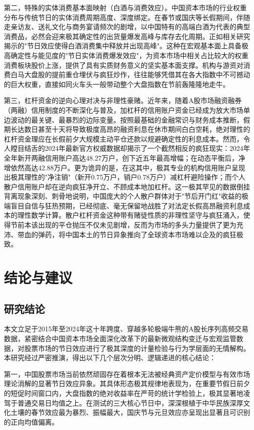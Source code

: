 \documentclass{cupb-thesis}
\begin{document}
{第二，特殊的实体消费基本面映射（白酒与消费效应）。中国资本市场的行业权重分布与传统节日的实体消费周期高度、深度绑定。在春节或国庆等长假期间，伴随走亲访友、送礼文化与商务宴请频次的剧增，以中国特有的高端白酒为代表的典型消费品，必然会迎来极其确定性的出货量爆发高峰与库存去化周期。正如相关研究揭示的"节日效应使得白酒消费集中释放并出现高峰"。这种在宏观基本面上具备极高确定性与能见度的"节日实体消费爆发效应"，为资本市场中相关占比较大的权重消费板块股价上涨，提供了具有实质财务意义的坚实基本面支撑。机构与游资对消费白马大盘股的提前重仓埋伏与疯狂炒作，往往能够凭借其在各大指数中不可撼动的巨大权重，直接如同火车头一般带动整个大盘指数在节前轰隆隆地走牛。


第三，杠杆资金的逆向心理对决与非理性豪赌。近年来，随着A股市场融资融券（两融）信用制度的不断深化与普及，加杠杆的信用账户资金已经成为放大市场单边波动的最关键、最暴烈的边际变量。按照最基础的金融常识与财务成本推断，假期长达数日甚至十天将导致极度高昂的融资利息在休市期间白白空耗，绝对理性的杠杆资金理应在长假前夕大规模主动平仓还款以规避确定性的利息成本。然而，令人瞠目结舌的2024年最新官方权威数据却揭示了一个截然相反的疯狂现实：2024年全年新开两融信用账户高达48.27万户，创下近五年最高增幅；在动态平衡后，净增依然高达42.88万户。更为诡异的是，在这其中，极其专业的机构信用账户呈现出极其理性的"净注销"（新开0.75万户，销户0.78万户）减杠杆避险操作；而个人散户信用账户却在逆向疯狂净开立、不顾成本地加杠杆。这一极其罕见的数据倒挂背离现象深刻、刺骨地说明，中国庞大的个人散户群体对于"节后开门红"收益的极端盲目自信与狂热预期，已经彻底、毫无保留地战胜了对法定长假高昂融资利息成本的理性数学计算。散户杠杆资金这种带有赌徒性质的非理性坚守与疯狂涌入，使得节前本该出现的平仓抛压不仅未见剧增，反而为市场的多头力量提供了更为充沛、带血的弹药，将中国本土的节日异象推向了全球资本市场难以企及的疯狂极致。


\chapter*{结论与建议}


\section{研究结论}


本文立足于2015年至2024年这十年跨度、穿越多轮极端牛熊的A股长序列高频交易数据，紧密结合中国资本市场全面深化改革下的最新微观结构变迁与宏观监管数据，对股票市场的节日效应进行了极其深度的计量检验与行为学层面的无情解构。本研究经过严密推演，得出以下几个层次分明、逻辑递进的核心结论：


第一，中国股票市场当前依然顽固存在着根本无法被经典资产定价模型与有效市场理论消解的显著节日效应异象。其具体形态极其规律地表现为，在重要节假日前夕的短促时间窗口内，大盘指数的绝对收益率在严苛的统计学检验上，极其显著地凌驾于普通交易日均值之上。在测试的三大核心节日中，深深根植于中华民族深厚文化土壤的春节效应最为暴烈、振幅最大，国庆节与元旦效应亦呈现出显著且可识别的正向均值偏离。

}
\end{document}
